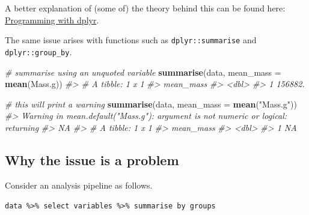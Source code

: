 \documentclass[]{book}
\newenvironment{Shaded}{}{}
\newcommand{\CommentTok}[1]{\textcolor[rgb]{0.38,0.63,0.69}{\textit{#1}}}
\newcommand{\DataTypeTok}[1]{\textcolor[rgb]{0.56,0.13,0.00}{#1}}
\newcommand{\FloatTok}[1]{\textcolor[rgb]{0.25,0.63,0.44}{#1}}
\newcommand{\KeywordTok}[1]{\textcolor[rgb]{0.00,0.44,0.13}{\textbf{#1}}}
\newcommand{\NormalTok}[1]{#1}
\newcommand{\OperatorTok}[1]{\textcolor[rgb]{0.40,0.40,0.40}{#1}}
\newcommand{\StringTok}[1]{\textcolor[rgb]{0.25,0.44,0.63}{#1}}
\begin{document}
A better explanation of (some of) the theory behind this can be found here: \href{https://dplyr.tidyverse.org/articles/programming.html\#setting-variable-names}{Programming with dplyr}.

The same issue arises with functions such as \texttt{dplyr::summarise} and \texttt{dplyr::group\_by}.

\begin{Shaded}
\begin{Highlighting}[]
\CommentTok{# summarise using an unquoted variable}
\KeywordTok{summarise}\NormalTok{(data,}
          \DataTypeTok{mean_mass =} \KeywordTok{mean}\NormalTok{(Mass.g))}
\CommentTok{#> # A tibble: 1 x 1}
\CommentTok{#>   mean_mass}
\CommentTok{#>       <dbl>}
\CommentTok{#> 1   156882.}

\CommentTok{# this will print a warning}
\KeywordTok{summarise}\NormalTok{(data,}
          \DataTypeTok{mean_mass =} \KeywordTok{mean}\NormalTok{(}\StringTok{"Mass.g"}\NormalTok{))}
\CommentTok{#> Warning in mean.default("Mass.g"): argument is not numeric or logical: returning}
\CommentTok{#> NA}
\CommentTok{#> # A tibble: 1 x 1}
\CommentTok{#>   mean_mass}
\CommentTok{#>       <dbl>}
\CommentTok{#> 1        NA}
\end{Highlighting}
\end{Shaded}

\hypertarget{why-the-issue-is-a-problem}{%
\subsection{Why the issue is a problem}\label{why-the-issue-is-a-problem}}

Consider an analysis pipeline as follows.

\texttt{data\ \%\textgreater{}\%\ select\ variables\ \%\textgreater{}\%\ summarise\ by\ groups}

\begin{Shaded}
\end{Shaded}
\end{document}
